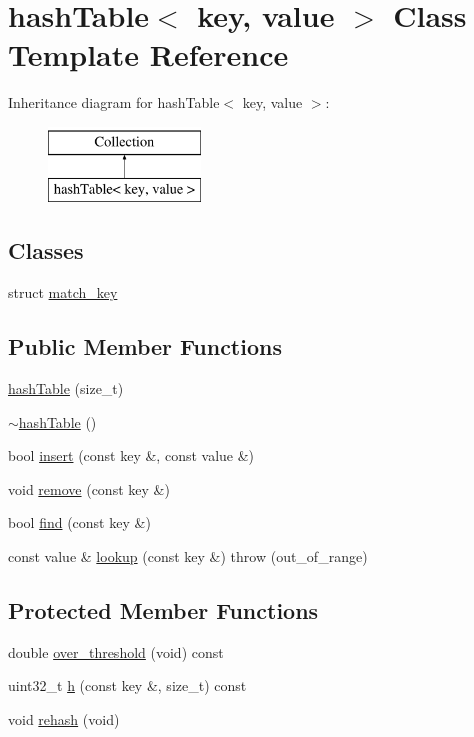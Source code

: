\hypertarget{classhashTable}{\section{hash\-Table$<$ key, value $>$ \-Class \-Template \-Reference}
\label{classhashTable}
}
\-Inheritance diagram for hash\-Table$<$ key, value $>$\-:\begin{figure}[H]
\begin{center}
\leavevmode
\includegraphics[height=2.000000cm]{classhashTable}
\end{center}
\end{figure}
\subsection*{\-Classes}
\begin{DoxyCompactItemize}
\item 
struct \hyperlink{structhashTable_1_1match__key}{match\-\_\-key}
\end{DoxyCompactItemize}
\subsection*{\-Public \-Member \-Functions}
\begin{DoxyCompactItemize}
\item 
\hyperlink{classhashTable_a8ae9875c4c48881ee257cd0ac7f4237f}{hash\-Table} (size\-\_\-t)
\item 
\hyperlink{classhashTable_a69ec411cfa79dab02e23a66a454b0941}{$\sim$hash\-Table} ()
\item 
bool \hyperlink{classhashTable_a90ba7ea30052d6ebbead60e74b870a7d}{insert} (const key \&, const value \&)
\item 
void \hyperlink{classhashTable_ad99da4a696e774472c03f8daf87a9334}{remove} (const key \&)
\item 
bool \hyperlink{classhashTable_a651aa0fa641d4296c5db721a9d0a5261}{find} (const key \&)
\item 
const value \& \hyperlink{classhashTable_a7b8da1d6bba42dc8dcbb779b313cb248}{lookup} (const key \&)  throw (out\-\_\-of\-\_\-range)
\end{DoxyCompactItemize}
\subsection*{\-Protected \-Member \-Functions}
\begin{DoxyCompactItemize}
\item 
double \hyperlink{classhashTable_aa2db38df630bf2d66b71905790186999}{over\-\_\-threshold} (void) const 
\item 
uint32\-\_\-t \hyperlink{classhashTable_add7331e8a3aecd9a78ccbadb7e059571}{h} (const key \&, size\-\_\-t) const 
\item 
void \hyperlink{classhashTable_aaf2de111000d757c72e4933c13fb658c}{rehash} (void)
\end{DoxyCompactItemize}
